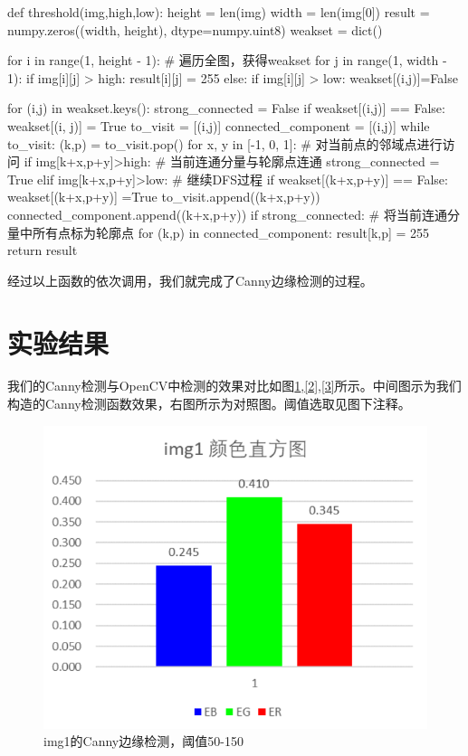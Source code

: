 \documentclass{article}
\begin{document}
\begin{python}
def threshold(img,high,low):
    height = len(img)
    width = len(img[0])
    result = numpy.zeros((width, height), dtype=numpy.uint8)
    weakset = dict()

    for i in range(1, height - 1):   # 遍历全图，获得weakset
        for j in range(1, width - 1):
            if img[i][j] > high:
                result[i][j] = 255
            else:
                if img[i][j] > low:
                    weakset[(i,j)]=False

    for (i,j) in weakset.keys():
        strong_connected = False
        if weakset[(i,j)] == False:
            weakset[(i, j)] = True
            to_visit = [(i,j)]
            connected_component = [(i,j)]
            while to_visit:
                (k,p) = to_visit.pop()
                for x, y in [-1, 0, 1]:    # 对当前点的邻域点进行访问
                    if img[k+x,p+y]>high:  # 当前连通分量与轮廓点连通
                        strong_connected = True
                    elif img[k+x,p+y]>low: # 继续DFS过程
                        if weakset[(k+x,p+y)] == False:
                            weakset[(k+x,p+y)] =True
                            to_visit.append((k+x,p+y))
                            connected_component.append((k+x,p+y))
            if strong_connected:           # 将当前连通分量中所有点标为轮廓点
                for (k,p) in connected_component:
                    result[k,p] = 255
    return result
\end{python}

经过以上函数的依次调用，我们就完成了Canny边缘检测的过程。



\section{实验结果}

我们的Canny检测与OpenCV中检测的效果对比如图\ref{1},\ref{2},\ref{3}所示。中间图示为我们构造的Canny检测函数效果，右图所示为对照图。阈值选取见图下注释。

\begin{figure}[htbp]
\centering
\includegraphics[width=13.5cm]{img/1-1.png}
\caption{img1的Canny边缘检测，阈值50-150}
\label{1}
\end{figure}
\end{document}
